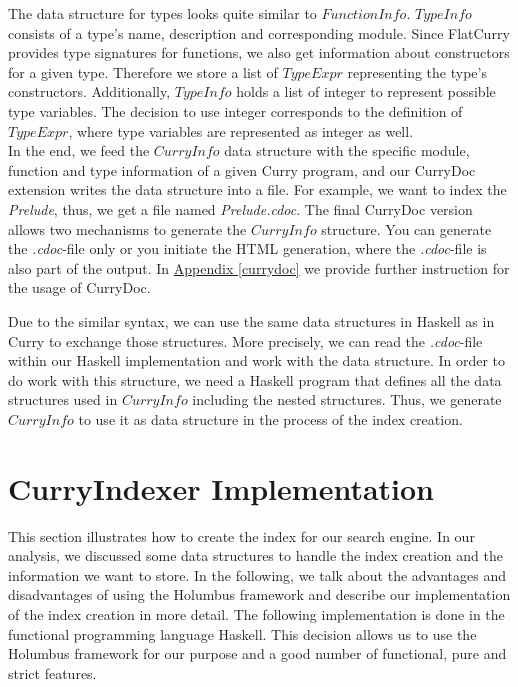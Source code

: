 \documentclass[%
	latex,%
	a4paper,%
	oneside,%
	chapterprefix,%
	headsepline,%
	12pt%
]{scrbook}
\newcommand{\Conid}[1]{\mathit{#1}}
\begin{document}
The data structure for types looks quite similar to \ensuremath{\Conid{FunctionInfo}}. %
\ensuremath{\Conid{TypeInfo}} consists of a type's name, description and corresponding
module. %
Since FlatCurry provides type signatures for functions, we also get
information about constructors for a given type. %
Therefore we store a list of \ensuremath{\Conid{TypeExpr}} representing the type's
constructors. %
Additionally, \ensuremath{\Conid{TypeInfo}} holds a list of integer to represent possible
type variables. %
The decision to use integer corresponds to the definition of
\ensuremath{\Conid{TypeExpr}}, where type variables are represented as integer as well.\\

In the end, we feed the \ensuremath{\Conid{CurryInfo}} data structure with the specific
module, function and type information of a given Curry program, and our
CurryDoc extension writes the data structure into a file. %
For example, we want to index the \emph{Prelude}, thus, we get a file named
\emph{Prelude.cdoc}. %
The final CurryDoc version allows two mechanisms to generate the
\ensuremath{\Conid{CurryInfo}} structure. %
You can generate the \emph{.cdoc}-file only or you initiate the HTML
generation, where the \emph{.cdoc}-file is also part of the output. %
In \hyperref[currydoc]{Appendix \ref{currydoc}} we provide further
instruction for the usage of CurryDoc.

Due to the similar syntax, we can use the same data structures in
Haskell as in Curry to exchange those structures. %
More precisely, we can read the \emph{.cdoc}-file within our Haskell
implementation and work with the data structure. %
In order to do work with this structure, we need a Haskell program that defines all the
data structures used in \ensuremath{\Conid{CurryInfo}} including the nested structures. %
Thus, we generate \ensuremath{\Conid{CurryInfo}} to use it as data structure in the
process of the index creation.

\section{CurryIndexer Implementation}\label{implementation:index}

This section illustrates how to create the index for our search
engine. %
In our analysis, we discussed some data structures to handle the index
creation and the information we want to store. %
In the following, we talk about the advantages and disadvantages of
using the Holumbus framework and describe our implementation of the
index creation in more detail. %
The following implementation is done in the functional
programming language Haskell. %
This decision allows us to use the Holumbus framework for our purpose
and a good number of functional, pure and strict features.\\
\end{document}
